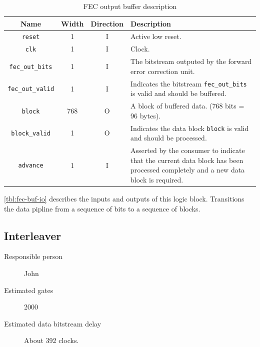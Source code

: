 \documentclass[dvips,10pt,twocolumn]{article}
\newcommand{\wire}{\texttt}
\begin{document}
\begin{table} \begin{tabularx}{\linewidth}{c|c|c|X}
	\label{tbl:fec-buf-io}
	Name & Width & Direction & Description \\ \hline

	\wire{reset} & 1 & I & Active low reset. \\

	\wire{clk} & 1 & I & Clock. \\

	\wire{fec\_out\_bits} & 1 & I & The bitstream outputed by the
	forward error correction unit. \\

	\wire{fec\_out\_valid} & 1 & I & Indicates the bitstream
	\wire{fec\_out\_bits} is valid and should be buffered. \\


	\wire{block} & 768 & O & A block of buffered data. (768 bits = 96
	bytes). \\

	\wire{block\_valid} & 1 & O & Indicates the data block
	\wire{block} is valid and should be processed. \\

	\wire{advance} & 1 & I & Asserted by the consumer to indicate that
	the current data block has been processed completely and a new data
	block is required. \\

\end{tabularx} \caption{FEC output buffer description} \end{table}

\autoref{tbl:fec-buf-io} describes the inputs and outputs of this logic
block.
Transitions the data pipline from a sequence of bits to a sequence of
blocks.


\subsection{Interleaver}
\label{sec:interleaver}
\begin{description}
	\item[Responsible person] John
	\item[Estimated gates] 2000
	\item[Estimated data bitstream delay] About 392 clocks.
\end{description}
	
\end{document}
